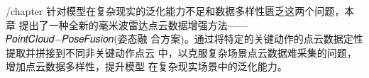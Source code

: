 /chapter{}
针对模型在复杂现实的泛化能力不足和数据多样性匮乏这两个问题，本章
提出了一种全新的毫米波雷达点云数据增强方法——𝑃𝑜𝑖𝑛𝑡𝐶𝑙𝑜𝑢𝑑−𝑃𝑜𝑠𝑒𝐹𝑢𝑠𝑖𝑜𝑛(姿态融
合方案)。通过将特定的关键动作的点云数据定性提取并拼接到不同非关键动作点云
中，以克服复杂场景点云数据难采集的问题，增加点云数据多样性，提升模型
在复杂现实场景中的泛化能力。 